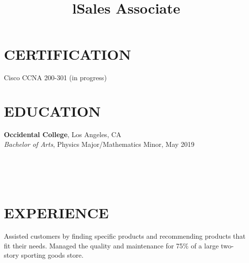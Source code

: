 \documentclass[margin]{res}
\begin{document}
\begin{resume}

	\section{CERTIFICATION}
	Cisco CCNA 200-301 (in progress)


\section{EDUCATION}
\textbf{Occidental College}, Los Angeles, CA\\
{\sl Bachelor of Arts}, Physics Major/Mathematics Minor, May 2019\hfill 


\begin{format}
\title{l}\\
\\
\body\\
\end{format}

\section{EXPERIENCE}
\title{\textbf{Sales Associate}}
\begin{position}
	Assisted customers by finding specific products and recommending products that fit their needs. Managed the quality and maintenance for 75\% of a large two-story sporting goods store.	
\end{position}


\end{resume}
\end{document}
